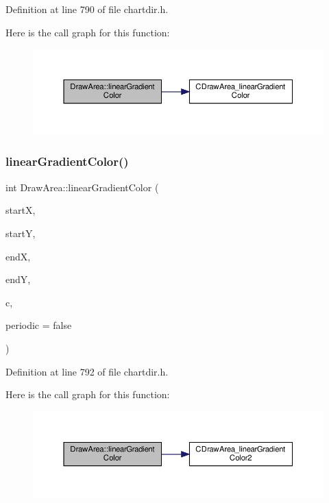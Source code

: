 Definition at line 790 of file chartdir.\+h.

Here is the call graph for this function\+:
\nopagebreak
\begin{figure}[H]
\begin{center}
\leavevmode
\includegraphics[width=350pt]{class_draw_area_a3dc9d9a2cecdf225f82f0e323642735a_cgraph}
\end{center}
\end{figure}
\mbox{\label{class_draw_area_a301faa1a07b37825f3a4aa076b338170}} 
\subsubsection{\texorpdfstring{linear\+Gradient\+Color()}{linearGradientColor()}\hspace{0.1cm}{\footnotesize\ttfamily [2/2]}}
{\footnotesize\ttfamily int Draw\+Area\+::linear\+Gradient\+Color (\begin{DoxyParamCaption}\item[{int}]{startX,  }\item[{int}]{startY,  }\item[{int}]{endX,  }\item[{int}]{endY,  }\item[{\hyperlink{class_int_array}{Int\+Array}}]{c,  }\item[{bool}]{periodic = {\ttfamily false} }\end{DoxyParamCaption})\hspace{0.3cm}{\ttfamily [inline]}}



Definition at line 792 of file chartdir.\+h.

Here is the call graph for this function\+:
\nopagebreak
\begin{figure}[H]
\begin{center}
\leavevmode
\includegraphics[width=350pt]{class_draw_area_a301faa1a07b37825f3a4aa076b338170_cgraph}
\end{center}
\end{figure}
\mbox{\label{class_draw_area_a4b52e06f246a047d3c9bff043fe300c3}} 

